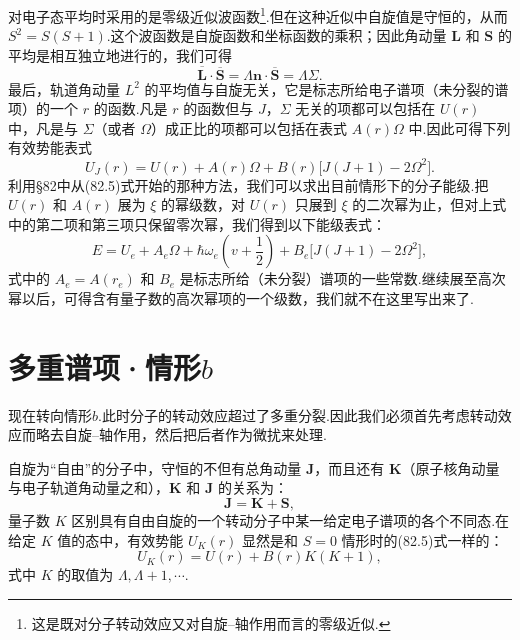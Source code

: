 对电子态平均时采用的是零级近似波函数\footnote{这是既对分子转动效应又对自旋–轴作用而言的零级近似.}.但在这种近似中自旋值是守恒的，从而 $S^2=S(S+1)$.这个波函数是自旋函数和坐标函数的乘积；因此角动量 $\boldsymbol{L}$ 和 $\boldsymbol{S}$ 的平均是相互独立地进行的，我们可得
\begin{equation*}
  \overline{\boldsymbol{L}}\cdot\overline{\boldsymbol{S}}=\Lambda\boldsymbol{n}\cdot\overline{\boldsymbol{S}}=\Lambda\Sigma.
\end{equation*}
最后，轨道角动量 $L^2$ 的平均值与自旋无关，它是标志所给电子谱项（未分裂的谱项）的一个 $r$ 的函数.凡是 $r$ 的函数但与 $J$，$\Sigma$ 无关的项都可以包括在 $U(r)$ 中，凡是与 $\Sigma$（或者 $\Omega$）成正比的项都可以包括在表式 $A(r)\Omega$ 中.因此可得下列有效势能表式
\begin{equation}
  U_J(r)=U(r)+A(r)\Omega+B(r)\bigl[J(J+1)-2\Omega^2\bigr].
\end{equation}
利用§82中从(82.5)式开始的那种方法，我们可以求出目前情形下的分子能级.把 $U(r)$ 和 $A(r)$ 展为 $\xi$ 的幂级数，对 $U(r)$ 只展到 $\xi$ 的二次幂为止，但对上式中的第二项和第三项只保留零次幂，我们得到以下能级表式：
\begin{equation}
  E=U_e+A_e\Omega+\hbar\omega_e\left(v+\frac{1}{2}\right)
  +B_e\bigl[J(J+1)-2\Omega^2\bigr],
\end{equation}
式中的 $A_e=A(r_e)$ 和 $B_e$ 是标志所给（未分裂）谱项的一些常数.继续展至高次幂以后，可得含有量子数的高次幂项的一个级数，我们就不在这里写出来了.

\section{多重谱项·情形\texorpdfstring{$b$}{b}}

现在转向情形$b$.此时分子的转动效应超过了多重分裂.因此我们必须首先考虑转动效应而略去自旋–轴作用，然后把后者作为微扰来处理.

自旋为“自由”的分子中，守恒的不但有总角动量 $\boldsymbol{J}$，而且还有 $\boldsymbol{K}$（原子核角动量与电子轨道角动量之和），$\boldsymbol{K}$ 和 $\boldsymbol{J}$ 的关系为：
\begin{equation}
  \boldsymbol{J}=\boldsymbol{K}+\boldsymbol{S},
\end{equation}
量子数 $K$ 区别具有自由自旋的一个转动分子中某一给定电子谱项的各个不同态.在给定 $K$ 值的态中，有效势能 $U_K(r)$ 显然是和 $S=0$ 情形时的(82.5)式一样的：
\begin{equation}
  U_K(r)=U(r)+B(r)K(K+1),
\end{equation}
式中 $K$ 的取值为 $\Lambda,\Lambda+1,\cdots$.

